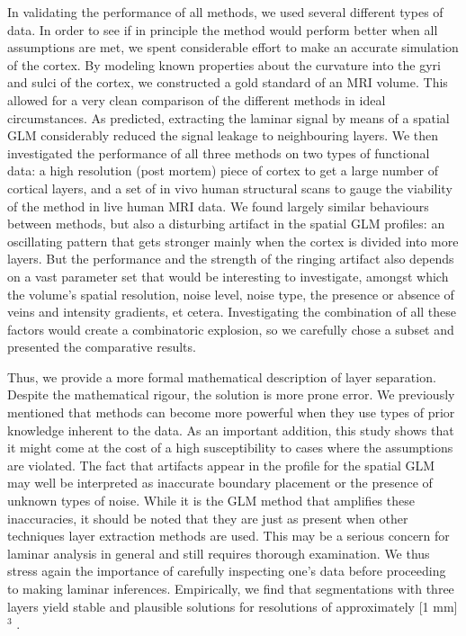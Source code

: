 In validating the performance of all methods, we used several different types of data. In order to see if in principle the method would perform better when all assumptions are met, we spent considerable effort to make an accurate simulation of the cortex. By modeling known properties about the curvature into the gyri and sulci of the cortex, we constructed a gold standard of an MRI volume. This allowed for a very clean comparison of the different methods in ideal circumstances. As predicted, extracting the laminar signal by means of a spatial GLM considerably reduced the signal leakage to neighbouring layers. We then investigated the performance of all three methods on two types of functional data: a high resolution (post mortem) piece of cortex to get a large number of cortical layers, and a set of in vivo human structural scans to gauge the viability of the method in live human MRI data. We found largely similar behaviours between methods, but also a disturbing artifact in the spatial GLM profiles: an oscillating pattern that gets stronger mainly when the cortex is divided into more layers. But the performance and the strength of the ringing artifact also depends on a vast parameter set that would be interesting to investigate, amongst which the volume's spatial resolution, noise level, noise type, the presence or absence of veins and intensity gradients, et cetera. Investigating the combination of all these factors would create a combinatoric explosion, so we carefully chose a subset and presented the comparative results.

Thus, we provide a more formal mathematical description of layer separation. Despite the mathematical rigour, the solution is more prone error. We previously mentioned that methods can become more powerful when they use types of prior knowledge inherent to the data. As an important addition, this study shows that it might come at the cost of a high susceptibility to cases where the assumptions are violated. The fact that artifacts appear in the profile for the spatial GLM may well be interpreted as inaccurate boundary placement or the presence of unknown types of noise. While it is the GLM method that amplifies these inaccuracies, it should be noted that they are just as present when other techniques layer extraction methods are used. This may be a serious concern for laminar analysis in general and still requires thorough examination. We thus stress again the importance of carefully inspecting one's data before proceeding to making laminar inferences. Empirically, we find that segmentations with three layers yield stable and plausible solutions for resolutions of approximately [1 mm]$^3$ .


